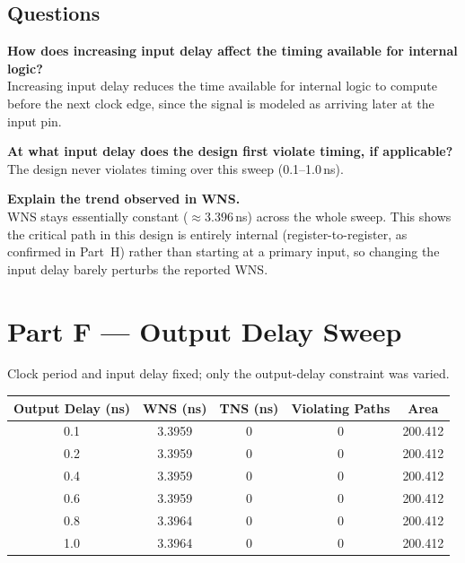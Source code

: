 \documentclass[11pt]{article}
\begin{document}
\subsection*{Questions}
\textbf{How does increasing input delay affect the timing available for internal logic?}\\
Increasing input delay reduces the time available for internal logic to compute before the next
clock edge, since the signal is modeled as arriving later at the input pin.

\textbf{At what input delay does the design first violate timing, if applicable?}\\
The design never violates timing over this sweep (0.1--1.0\,ns).

\textbf{Explain the trend observed in WNS.}\\
WNS stays essentially constant ($\approx3.396$\,ns) across the whole sweep. This shows the critical
path in this design is entirely internal (register-to-register, as confirmed in Part~H) rather than
starting at a primary input, so changing the input delay barely perturbs the reported WNS.

\section{Part F --- Output Delay Sweep}
Clock period and input delay fixed; only the output-delay constraint was varied.
\begin{center}
\begin{tabular}{|c|c|c|c|c|}
\hline
\textbf{Output Delay (ns)} & \textbf{WNS (ns)} & \textbf{TNS (ns)} & \textbf{Violating Paths} & \textbf{Area} \\ \hline
0.1 & 3.3959 & 0 & 0 & 200.412 \\ \hline
0.2 & 3.3959 & 0 & 0 & 200.412 \\ \hline
0.4 & 3.3959 & 0 & 0 & 200.412 \\ \hline
0.6 & 3.3959 & 0 & 0 & 200.412 \\ \hline
0.8 & 3.3964 & 0 & 0 & 200.412 \\ \hline
1.0 & 3.3964 & 0 & 0 & 200.412 \\ \hline
\end{tabular}
\end{center}
\end{document}
